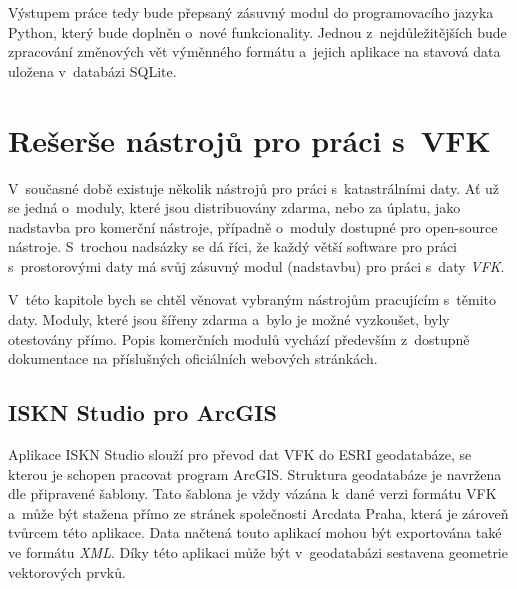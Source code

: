 \documentclass[a4paper,12pt,oneside]{book}
\begin{document}
Výstupem práce tedy bude přepsaný zásuvný modul do programovacího
jazyka Python, který bude doplněn o~nové funkcionality. Jednou
z~nejdůležitějších bude zpracování změnových vět výměnného formátu
a~jejich aplikace na stavová data uložena v~databázi SQLite.


\clearpage
\rhead{{\rightmark}}
\chapter{Rešerše nástrojů pro práci s~VFK}

V~současné době existuje několik nástrojů pro práci s~katastrálními
daty. Ať už se jedná o~moduly, které jsou distribuovány zdarma, nebo
za úplatu, jako nadstavba pro komerční nástroje, případně o~moduly
dostupné pro open-source nástroje. S~trochou nadsázky se dá říci, že
každý větší software pro práci s~prostorovými daty má svůj zásuvný
modul (nadstavbu) pro práci s~daty \textit{VFK}.

V~této kapitole bych se chtěl věnovat vybraným nástrojům pracujícím
s~těmito daty. Moduly, které jsou šířeny zdarma a~bylo je možné
vyzkoušet, byly otestovány přímo. Popis komerčních modulů vychází
především z~dostupně dokumentace na příslušných oficiálních webových
stránkách.

\section{ISKN Studio pro ArcGIS}
\label{l_iskn_studio}
Aplikace ISKN Studio slouží pro převod dat VFK do ESRI geodatabáze, se
kterou je schopen pracovat program ArcGIS. Struktura geodatabáze je
navržena dle připravené šablony. Tato šablona je vždy vázána k~dané
verzi formátu VFK a~může být stažena přímo ze stránek společnosti
Arcdata Praha, která je zároveň tvůrcem této aplikace. Data načtená
touto aplikací mohou být exportována také ve formátu
\textit{XML}. Díky této aplikaci může být v~geodatabázi sestavena
geometrie vektorových prvků. \cite{iskn_studio}
\end{document}
